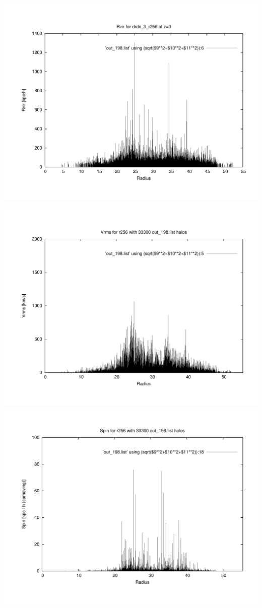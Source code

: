 \includegraphics[scale=0.3]{r256/h100/drdx_3_r256/plot_rvir_z0.pdf}

\includegraphics[scale=0.3]{r256/h100/drdx_3_r256/plot_Vrms_out_198.pdf}
\includegraphics[scale=0.3]{r256/h100/drdx_3_r256/plot_spin_out_198.pdf}


